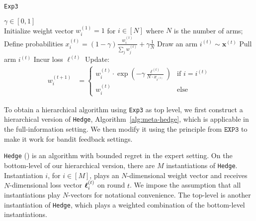 \begin{algorithm}
   \caption{\texttt{Exp3}}
   \label{alg:exp3}
   \begin{algorithmic}   
       $\gamma\in[0,1]$\\
   \STATE Initialize weight vector $w^{(1)}_{i}=1$ for $i\in[N]$ where $N$ is the number of arms;
	   \STATE Define probabilities $x_i^{(t)} = (1-\gamma)\frac{w_i^{(t)}}{ \sum_j w_{j}^{(t)} } + \gamma\frac{1}{N}$
	   \STATE Draw an arm $i^{(t)} \sim\mathbf{x}^{(t)}$
	\STATE Pull arm $i^{(t)} $
	   \STATE Incur loss $\ell^{(t)}$
	   \STATE Update:
	   \begin{align}
		w^{(t+1)}_i & = \begin{cases}
		   w_{i}^{(t)} \cdot \exp(-\gamma \frac{\ell^{(t)}}{N\cdot x_{i^{(t)}}})
			 & \text{if } i=i^{(t)} \\
			w^{(t)}_{i} & \text{else}
		\end{cases}		
		\end{align}
    \ENDFOR
       	\end{algorithmic}
\end{algorithm}         
 
To obtain a hierarchical algorithm using \texttt{Exp3} as top level, we first construct a hierarchical version of \texttt{Hedge}, Algorithm~\ref{alg:meta-hedge}, which is applicable in the full-information setting. We then modify it using the principle from $\texttt{EXP3}$ to make it work for bandit feedback settings.

\texttt{Hedge} (\cite{chang:05}) is an algorithm with bounded regret in the expert setting.
On the bottom-level of our hierarchical version, there are $M$ instantiations of \texttt{Hedge}. Instantiation $i$, for $i\in[M]$, plays an $N$-dimensional weight vector and receives $N$-dimensional loss vector $\boldsymbol\ell^{(t)}_{i}$ on round $t$. We impose the assumption that all instantiations play $N$-vectors for notational convenience. The top-level is another instantiation of \texttt{Hedge}, which plays a weighted combination of the bottom-level instantiations.

